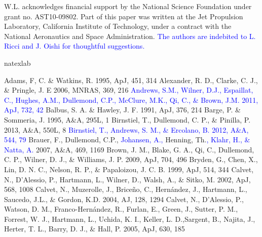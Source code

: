 \documentclass[apj]{emulateapj}
\def\blue#1{\textcolor{blue}{#1}}
\begin{document}
\acknowledgments W.L. acknowledges financial support by the National Science
Foundation under grant no. AST10-09802. Part of this paper was written
at the Jet Propulsion Laboratory, California Institute of Technology, under a contract with the
National Aeronautics and Space Administration. \blue{The authors are indebited to L. Ricci and 
J. Oishi for thoughtful suggestions.} 

\begin{thebibliography}{}
\expandafter\ifx\csname natexlab\endcsname\relax\def\natexlab#1{#1}\fi

 Adams, F, C. \& Watkins, R. 1995, ApJ, 451, 314
 Alexander, R. D., Clarke, C. J., \& Pringle, J. E 2006, MNRAS, 369, 216
\bibitem[{{\blue{Andrews et al.}}(2011)}]{Andrews11} \blue{Andrews, S.M., Wilner, D.J., Espaillat, C., Hughes, A.M., Dullemond, C.P., McClure, M.K., Qi, C., \& Brown, J.M. 2011, ApJ, 732, 42} 
 Balbus, S. A. \&  Hawley, J. F. 1991, ApJ, 376, 214
 Barge, P. \&  Sommeria, J. 1995, A\&A, 295L, 1
 Birnstiel, T., Dullemond, C. P., \& Pinilla, P. 2013, A\&A, 550L, 8
\bibitem[{{\blue{Birnstiel et al.}}(2012)}]{Birnstiel12} \blue{Birnstiel, T., Andrews, S. M., \& Ercolano, B. 2012, A\&A, 544, 79}
 Brauer, F., Dullemond, C.P., \blue{Johansen, A.,} Henning, Th.\blue{, Klahr, H., \& Natta, A.} 2007, A\&A, 469, 1169
 Brown, J. M., Blake, G. A., Qi, C., Dullemond, C. P., Wilner, D. J., \& Williams, J. P. 2009, ApJ, 704, 496
 Bryden, G., Chen, X., Lin, D. N. C., Nelson, R. P., \& Papaloizou, J. C. B. 1999, ApJ, 514, 344
 Calvet, N., D'Alessio, P., Hartmann, L., Wilner, D., Walsh, A., \& Sitko, M. 2002, ApJ, 568, 1008
 Calvet, N., Muzerolle, J., Brice\~no, C.,  Hern\'andez, J., Hartmann, L., Saucedo, J.L., \& Gordon, K.D. 2004, AJ, 128, 1294
 Calvet, N., D'Alessio, P., Watson, D. M., Franco-Hern\'andez, R., Furlan, E., Green, J., Sutter, P. M., Forrest, W. J., Hartmann, L., Uchida, K. I., Keller, L. D.,Sargent, B., Najita, J., Herter, T. L., Barry, D. J., \& Hall, P. 2005, ApJ, 630, 185

\end{thebibliography}
\end{document}
